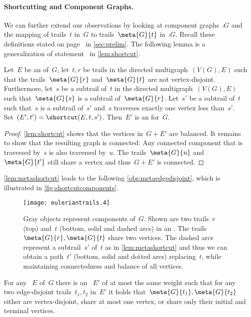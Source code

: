 \paragraph{Shortcutting and Component Graphs.}We can further extend our observations by looking at component graphs~$\comp{G}$ and the mapping of trails~$t$ in~$G$ to trails~$\meta{G}{t}$ in~$\comp{G}$. Recall these definitions stated on page~\pageref{def:meta} in \autoref{sec:prelim}. The following lemma is a generalization of statement~ in \autoref{lem:shortcut}.
\begin{lemma}
  \label{lem:metashortcut}
  Let~$E$ be an \EE{} of~$G$, let~$t, r$ be trails in the directed multigraph~$(V(G), E)$ such that the trails~$\meta{G}{r}$ and~$\meta{G}{t}$ are not vertex-disjoint. Furthermore, let~$s$ be a subtrail of~$t$ in the directed multigraph~$(V(G), E)$ such that~$\meta{G}{s}$ is a subtrail of~$\meta{G}{r}$. Let~$s'$ be a subtrail of~$t$ such that~$s$ is a subtrail of~$s'$ and~$s$ traverses exactly one vertex less than~$s'$. Set~$(E', t') = \shortcut(E, t, s')$. Then~$E'$ is an \EE{} for~$G$.
\end{lemma}
\begin{proof}
  \autoref{lem:shortcut} shows that the vertices in~$G + E'$ are balanced. It remains to show that the resulting graph is connected: Any connected component that is traversed by~$s$ is also traversed by~$u$. The trails~$\meta{G}{u}$ and $\meta{G}{t'}$ still share a vertex and thus~$G + E'$ is connected.
\end{proof}
\autoref{lem:metashortcut} leads to the following \autoref{obs:metaedgedisjoint}, which is illustrated in \autoref{fig:shortcutcomponents}.\begin{figure}
  \begin{center}
    \texttt{[image: euleriantrails.4]}
    \caption{Gray objects represent components of~$G$. Shown are two trails~$r$ (top) and~$t$ (bottom, solid and dashed arcs) in an \EE . The trails~$\meta{G}{r}, \meta{G}{t}$ share two vertices. The dashed arcs represent a subtrail~$s'$ of~$t$ as in \autoref{lem:metashortcut} and thus we can obtain a path~$t'$ (bottom, solid and dotted arcs) replacing~$t$, while maintaining connectedness and balance of all vertices.}
    \label{fig:shortcutcomponents}
  \end{center}
\end{figure}\begin{observation}
  \label{obs:metaedgedisjoint}
  For any \EE{}~$E$ of~$G$ there is an \EE{}~$E'$ of at most the same weight such that for any two edge-disjoint trails~$t_1, t_2$ in~$E'$ it holds that~$\meta{G}{t_1}, \meta{G}{t_2}$ either are vertex-disjoint, share at most one vertex, or share only their initial and terminal vertices.
\end{observation}
